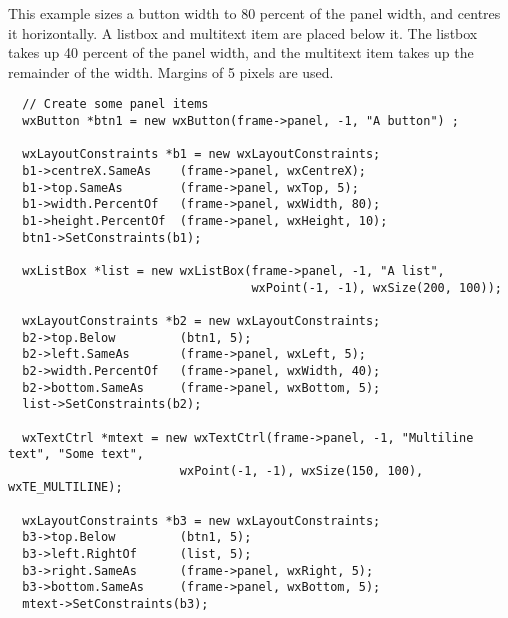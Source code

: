 This example sizes a button width to 80 percent of the panel width, and centres
it horizontally. A listbox and multitext item are placed below it. The listbox
takes up 40 percent of the panel width, and the multitext item takes up
the remainder of the width. Margins of 5 pixels are used.

\begin{verbatim}
  // Create some panel items
  wxButton *btn1 = new wxButton(frame->panel, -1, "A button") ;

  wxLayoutConstraints *b1 = new wxLayoutConstraints;
  b1->centreX.SameAs    (frame->panel, wxCentreX);
  b1->top.SameAs        (frame->panel, wxTop, 5);
  b1->width.PercentOf   (frame->panel, wxWidth, 80);
  b1->height.PercentOf  (frame->panel, wxHeight, 10);
  btn1->SetConstraints(b1);

  wxListBox *list = new wxListBox(frame->panel, -1, "A list",
                                  wxPoint(-1, -1), wxSize(200, 100));

  wxLayoutConstraints *b2 = new wxLayoutConstraints;
  b2->top.Below         (btn1, 5);
  b2->left.SameAs       (frame->panel, wxLeft, 5);
  b2->width.PercentOf   (frame->panel, wxWidth, 40);
  b2->bottom.SameAs     (frame->panel, wxBottom, 5);
  list->SetConstraints(b2);

  wxTextCtrl *mtext = new wxTextCtrl(frame->panel, -1, "Multiline text", "Some text",
                        wxPoint(-1, -1), wxSize(150, 100), wxTE_MULTILINE);
  
  wxLayoutConstraints *b3 = new wxLayoutConstraints;
  b3->top.Below         (btn1, 5);
  b3->left.RightOf      (list, 5);
  b3->right.SameAs      (frame->panel, wxRight, 5);
  b3->bottom.SameAs     (frame->panel, wxBottom, 5);
  mtext->SetConstraints(b3);
\end{verbatim}



